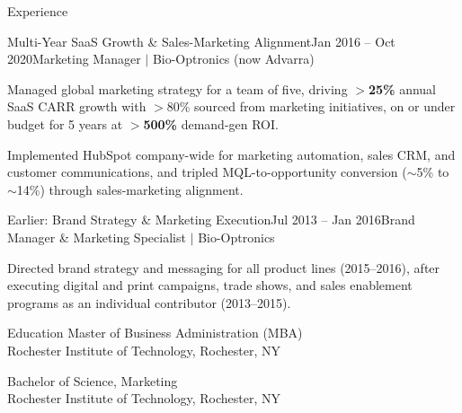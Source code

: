 \documentclass{resume}
\begin{document}
\begin{rSection}{Experience}
\begin{rSubsection}{Multi-Year SaaS Growth \& Sales-Marketing Alignment}{\textcolor{black!60}{Jan 2016 -- Oct 2020}}{Marketing Manager $\vert$ Bio-Optronics (now Advarra)}{}
\item Managed global marketing strategy for a team of five, driving $>$\textbf{25\%} annual SaaS CARR growth with $>$80\% sourced from marketing initiatives, on or under budget for 5 years at $>$\textbf{500\%} demand-gen ROI.
\item Implemented HubSpot company-wide for marketing automation, sales CRM, and customer communications, and tripled MQL-to-opportunity conversion ($\sim$5\% to $\sim$14\%) through sales-marketing alignment.
\end{rSubsection}

\begin{rSubsection}{Earlier: Brand Strategy \& Marketing Execution}{\textcolor{black!60}{Jul 2013 -- Jan 2016}}{Brand Manager \& Marketing Specialist $\vert$ Bio-Optronics}{}
\item Directed brand strategy and messaging for all product lines (2015--2016), after executing digital and print campaigns, trade shows, and sales enablement programs as an individual contributor (2013--2015).
\end{rSubsection}

\end{rSection}
\vspace{-0.15cm}


\begin{rSection}{Education}
{Master of Business Administration (MBA)} \hfill {\textcolor{black!60}{}}\\
{Rochester Institute of Technology}, Rochester, NY

{Bachelor of Science, Marketing} \hfill {\textcolor{black!60}{}}\\
{Rochester Institute of Technology}, Rochester, NY
\end{rSection}
\end{document}
